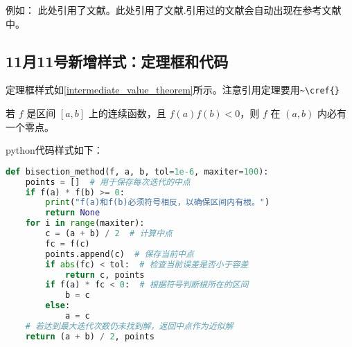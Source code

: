 例如：
此处引用了文献\cite{kincaid2002numerical}。此处引用了文献\cite{2016The}.引用过的文献会自动出现在参考文献中。


\subsection{11月11号新增样式：定理框和代码}
定理框样式如\cref{intermediate_value_theorem}所示。注意引用定理要用\verb|~\cref{}|
\begin{tcolorbox}
\begin{Theorem}
 若 $f$ 是区间 $[a, b]$ 上的连续函数，且 $f(a) f(b) < 0$，则 $f$ 在 $(a, b)$ 内必有一个零点。
 \label{intermediate_value_theorem}
\end{Theorem}
\end{tcolorbox}

python代码样式如下：
\begin{lstlisting}[language=Python]
def bisection_method(f, a, b, tol=1e-6, maxiter=100):
    points = []  # 用于保存每次迭代的中点
    if f(a) * f(b) >= 0:
        print("f(a)和f(b)必须符号相反，以确保区间内有根。")
        return None
    for i in range(maxiter):
        c = (a + b) / 2  # 计算中点
        fc = f(c)
        points.append(c)  # 保存当前中点
        if abs(fc) < tol:  # 检查当前误差是否小于容差
            return c, points
        if f(a) * fc < 0:  # 根据符号判断根所在的区间
            b = c
        else:
            a = c
    # 若达到最大迭代次数仍未找到解，返回中点作为近似解
    return (a + b) / 2, points
\end{lstlisting}
